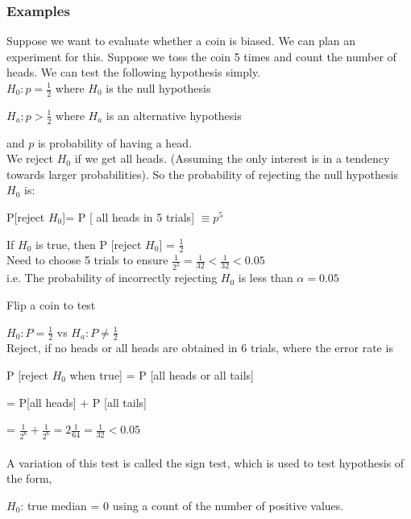 \documentclass[12pt,a4paper]{article}
\theoremstyle{regla}
\theoremstyle{remark}
\theoremstyle{definition}
\theoremstyle{nonumberbreak}
\begin{document}
\subsubsection{Examples}
\begin{xmpl}
Suppose we want to evaluate whether a coin is biased. We can plan an experiment for this. Suppose we toss the coin 5 times and count the number of heads. We can test the following hypothesis simply.\\


$H_0: p = \frac {1} {2}$ where $H_0$ is the null hypothesis

$H_a ; p > \frac {1} {2}$ where $H_a$ is an alternative hypothesis

and $p$ is probability of having a head.\\

We reject $H_0$ if we get all heads. (Assuming the only interest is in a tendency towards larger probabilities). So the probability of rejecting the null hypothesis $H_0$ is:

P[reject $H_0$]= P [ all  heads in 5 trials] $\equiv p^5$

If $H_0$ is true, then P [reject $H_0$] = $\frac {1} {2}$\\

Need to choose 5 trials to ensure $\frac {1} {2^5} = \frac {1} {32} < \frac {1} {32} < 0.05 $\\

i.e. The probability of incorrectly rejecting $H_0$ is less than $\alpha = 0.05$
\end{xmpl}
\begin{xmpl}

Flip a coin to test 

$ H_0: P = \frac {1} {2}$  vs
$H_a: P \neq \frac {1} {2}$\\

Reject, if no heads or all heads are obtained in 6 trials, where the error rate is

P [reject $H_0$ when true] = P [all heads or all tails]
												
 = P[all heads] + P [all tails]
												
 = $\frac {1} {2^6} + \frac {1} {2^6} = 2 \frac {1} {64} = \frac {1} {32} < 0.05$\\\\


A variation of this test is called the sign test, which is used to test hypothesis of the form,

$ H_0$: true median = 0 using a count of the number of positive values.
\end{xmpl}
\end{document}
